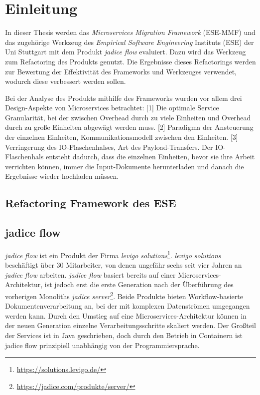 \chapter{Einleitung}
\label{chap:einleitung}

In dieser Thesis werden das \emph{Microservices Migration Framework} (ESE-MMF) und das zugehörige Werkzeug des \emph{Empirical Software Engineering} Instituts (ESE) der Uni Stuttgart mit dem Produkt \emph{jadice flow} evaluiert.
Dazu wird das Werkzeug zum Refactoring des Produkts genutzt. 
Die Ergebnisse dieses Refactorings werden zur Bewertung der Effektivität des Frameworks und Werkzeuges verwendet, wodurch diese verbessert werden sollen.

Bei der Analyse des Produkts mithilfe des Frameworks wurden vor allem drei Design-Aspekte von Microservices betrachtet:
[1] Die optimale Service Granularität, bei der zwischen Overhead durch zu viele Einheiten und Overhead durch zu große Einheiten abgewägt werden muss.
[2] Paradigma der Ansteuerung der einzelnen Einheiten, Kommunikationsmodell zwischen den Einheiten.
[3] Verringerung des IO-Flaschenhalses, Art des Payload-Transfers.
Der IO-Flaschenhals entsteht dadurch, dass die einzelnen Einheiten, bevor sie ihre Arbeit verrichten können, immer die Input-Dokumente herunterladen und danach die Ergebnisse wieder hochladen müssen.

\section{Refactoring Framework des ESE}
\section{jadice flow}

\emph{jadice flow} ist ein Produkt der Firma \emph{levigo solutions}\footnote{\url{https://solutions.levigo.de/}}.
\emph{levigo solutions} beschäftigt über 30 Mitarbeiter, von denen ungefähr sechs seit vier Jahren an \emph{jadice flow} arbeiten.
\emph{jadice flow} basiert bereits auf einer Microservices-Architektur, ist jedoch erst die erste Generation nach der Überführung des vorherigen Monoliths \emph{jadice server}\footnote{\url{https://jadice.com/produkte/server/}}.
Beide Produkte bieten Workflow-basierte Dokumentenverarbeitung an, bei der mit komplexen Datenströmen umgegangen werden kann.
Durch den Umstieg auf eine Microservices-Architektur können in der neuen Generation einzelne Verarbeitungsschritte skaliert werden.
Der Großteil der Services ist in Java geschrieben, doch durch den Betrieb in Containern ist jadice flow prinzipiell unabhängig von der Programmiersprache.

